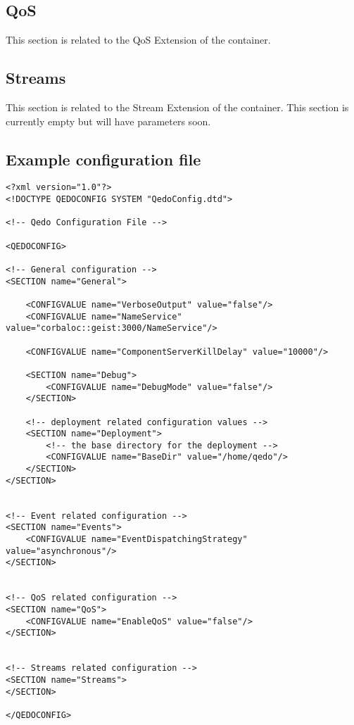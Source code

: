 \documentclass[12pt,a4paper]{report}
\begin{document}
\subsection{QoS}
\label{QoS}
This section is related to the QoS Extension of the container.



\subsection{Streams}
\label{Streams}
This section is related to the Stream Extension of the container. This section is currently empty but will have parameters soon.

\subsection{Example configuration file}
\label{example}
\begin{verbatim}
<?xml version="1.0"?>
<!DOCTYPE QEDOCONFIG SYSTEM "QedoConfig.dtd">

<!-- Qedo Configuration File -->

<QEDOCONFIG>

<!-- General configuration -->
<SECTION name="General">

	<CONFIGVALUE name="VerboseOutput" value="false"/>
	<CONFIGVALUE name="NameService" value="corbaloc::geist:3000/NameService"/>

	<CONFIGVALUE name="ComponentServerKillDelay" value="10000"/>

	<SECTION name="Debug">
		<CONFIGVALUE name="DebugMode" value="false"/>
	</SECTION>

	<!-- deployment related configuration values -->
	<SECTION name="Deployment">
		<!-- the base directory for the deployment -->
		<CONFIGVALUE name="BaseDir" value="/home/qedo"/>
	</SECTION>
</SECTION>

	
<!-- Event related configuration -->
<SECTION name="Events">
	<CONFIGVALUE name="EventDispatchingStrategy" value="asynchronous"/>
</SECTION>

	
<!-- QoS related configuration -->
<SECTION name="QoS">
	<CONFIGVALUE name="EnableQoS" value="false"/>
</SECTION>


<!-- Streams related configuration -->
<SECTION name="Streams">
</SECTION>

</QEDOCONFIG>

\end{verbatim}
\end{document}

